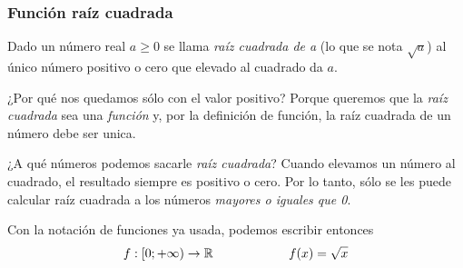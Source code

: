 \documentclass[../Teoría.root.tex]{subfiles}
\begin{document}
\subsubsection{Función raíz cuadrada}
Dado un número real \(a\geq0\) se llama \textit{raíz cuadrada de a} (lo que se nota \(\sqrt{a}\)) al único número positivo o cero que elevado al cuadrado da \(a\).
\begin{center}
\end{center}
¿Por qué nos quedamos sólo con el valor positivo? Porque queremos que la \textit{raíz cuadrada} sea una \textit{función} y, por la definición de función, la raíz cuadrada de un número debe ser unica.

¿A qué números podemos sacarle \textit{raíz cuadrada}? Cuando elevamos un número al cuadrado, el resultado siempre es positivo o cero.
Por lo tanto, sólo se les puede calcular raíz cuadrada a los números \textit{mayores o iguales que 0}.

Con la notación de funciones ya usada, podemos escribir entonces
\[f:[0;+\infty)\rightarrow\mathbb{R} \qquad\qquad\qquad f(x)=\sqrt{x}\]
\end{document}
